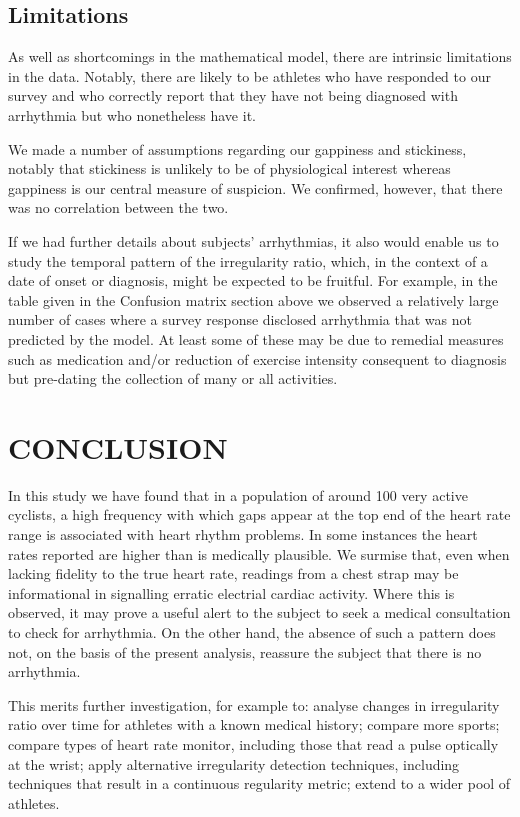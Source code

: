 \documentclass[
  letterpaper,
  DIV=11,
  numbers=noendperiod]{scrartcl}
\begin{document}
\subsection{Limitations}\label{limitations}

As well as shortcomings in the mathematical model, there are intrinsic
limitations in the data. Notably, there are likely to be athletes who
have responded to our survey and who correctly report that they have not
being diagnosed with arrhythmia but who nonetheless have it.

We made a number of assumptions regarding our gappiness and stickiness,
notably that stickiness is unlikely to be of physiological interest
whereas gappiness is our central measure of suspicion. We confirmed,
however, that there was no correlation between the two.

If we had further details about subjects' arrhythmias, it also would
enable us to study the temporal pattern of the irregularity ratio,
which, in the context of a date of onset or diagnosis, might be expected
to be fruitful. For example, in the table given in the Confusion matrix
section above we observed a relatively large number of cases where a
survey response disclosed arrhythmia that was not predicted by the
model. At least some of these may be due to remedial measures such as
medication and/or reduction of exercise intensity consequent to
diagnosis but pre-dating the collection of many or all activities.

\section{CONCLUSION}\label{conclusion-1}

In this study we have found that in a population of around 100 very
active cyclists, a high frequency with which gaps appear at the top end
of the heart rate range is associated with heart rhythm problems. In
some instances the heart rates reported are higher than is medically
plausible. We surmise that, even when lacking fidelity to the true heart
rate, readings from a chest strap may be informational in signalling
erratic electrial cardiac activity. Where this is observed, it may prove
a useful alert to the subject to seek a medical consultation to check
for arrhythmia. On the other hand, the absence of such a pattern does
not, on the basis of the present analysis, reassure the subject that
there is no arrhythmia.

This merits further investigation, for example to: analyse changes in
irregularity ratio over time for athletes with a known medical history;
compare more sports; compare types of heart rate monitor, including
those that read a pulse optically at the wrist; apply alternative
irregularity detection techniques, including techniques that result in a
continuous regularity metric; extend to a wider pool of athletes.
\end{document}
